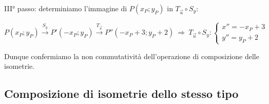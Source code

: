 III° passo: determiniamo l'immagine di $P(x_P;y_P)$ in $T_{\vec{u}}\circ S_y$:
			
\[P(x_P;y_P)\overset{S_y}\rightarrow P'(-x_P;y_P) \overset{T_{\vec{u}}}\rightarrow P''(-x_P+3;y_P+2)\:\Rightarrow\: T_{\vec{u}}\circ S_y:\begin{cases}x''=-x_P+3\\ y''=y_P+2\end{cases}\]
			
Dunque confermiamo la non commutatività dell'operazione di composizione delle isometrie.
			
\begin{comment}			
73   Nel piano è assegnato il punto C e il vettore ; costruite l’immagine del punto P nell’isometria  e anche l’immagine dello stesso punto P nell’isometria  .
74   Il centro della simmetria è il punto , il vettore della traslazione è  e il punto di cui vogliamo determinare l’immagine è scelto da voi arbitrariamente. Ripetete l’esercizio precedente e determinate l’equazione di 
75   Sono assegnati il punto C(-4,3), la retta x=1 e il punto P(0,5); determinate l’immagine P” di P nell’isometria  e l’immagine P* di P nell’isometria . È vero che p” e P* si corrispondono nella simmetria ? Determinate l’area del triangolo PP”P*.	(R. area=40u2)
76   È assegnato un punto O; determinate l’immagine P’ di un punto P nella rotazione di centro O e angolo di 60° e l’immagine P” di P’ nella simmetria avente come asse la retta PO. 
1. Completate: 
2. Dimostrate che P, P’, P” appartengono alla circonferenza di centro O e raggio OP
3. Individuate le caratteristiche del quadrilatero PP”OP’
4. Determinatene l’area, supponendo 			(R. )
\end{comment}
			
\subsection{Composizione di isometrie dello stesso tipo}
			
